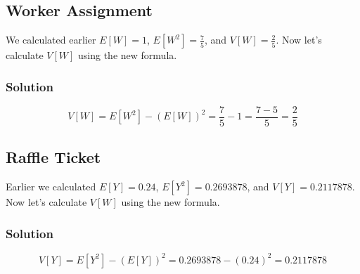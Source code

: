\documentclass[11pt]{article}
\theoremstyle{definition}
\begin{document}
\subsection{Worker Assignment}

We calculated earlier $E[W]=1$, $E[W^2]=\frac{7}{5}$, and $V[W]=\frac{2}{5}$. Now let's calculate $V[W]$ using the new formula.

\subsubsection*{Solution}

$$
	V[W] = E[W^2] - (E[W])^2 = \frac{7}{5} - 1 = \frac{7-5}{5} = \frac{2}{5}
$$

\subsection{Raffle Ticket}

Earlier we calculated $E[Y] = 0.24$, $E[Y^2] = 0.2693878$, and $V[Y]=0.2117878$. Now let's calculate $V[W]$ using the new formula.

\subsubsection*{Solution}

$$
	V[Y] = E[Y^2] - (E[Y])^2 = 0.2693878 - (0.24)^2 = 0.2117878
$$
\end{document}
